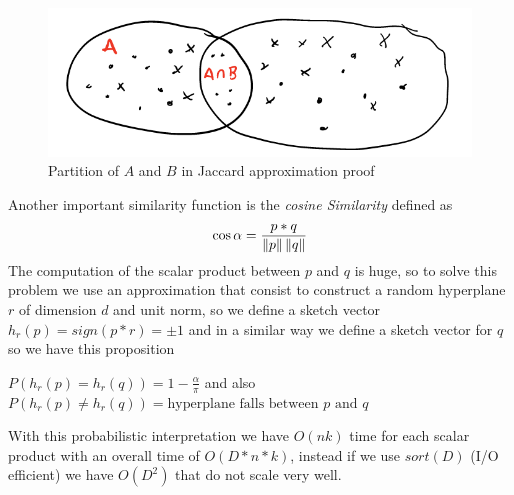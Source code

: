     \begin{figure}
	    \includegraphics[width=\textwidth]{Images/jaccardProof}
	    \caption{Partition of $A$ and $B$ in Jaccard approximation proof}
	    \label{img:jaccardProof}
    \end{figure}

    Another important similarity function is the \emph{cosine Similarity} defined as 
    \[ \cos \alpha = \frac{p * q}{\left\lVert p\right\rVert \left\lVert q\right\rVert} \]
    The computation of the scalar product between $p$ and $q$ is huge, so to solve this problem we use an approximation that consist to construct a random hyperplane $r$ of dimension $d$ and unit norm,
    so we define a sketch vector $h_r(p) = sign(p * r) = \pm 1$ and in a similar way we define a sketch vector for $q$ so we have this proposition
    \begin{prop}
	    $P(h_r(p) = h_r(q)) = 1 - \frac{\alpha}{\pi}$ and also $P(h_r(p) \neq h_r(q)) = \text{hyperplane falls between } p \text{ and } q$
    \end{prop}
    With this probabilistic interpretation we have $O(nk)$ time for each scalar product with an overall time of $O(D * n * k)$, instead if we use $sort(D)$ (I/O efficient) 
    we have $O(D^2)$ that do not scale very well.


